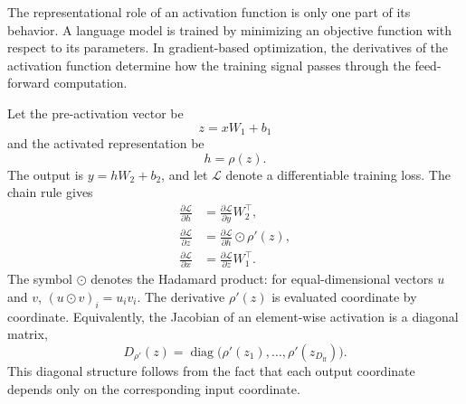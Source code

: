 The representational role of an activation function is only one part of its
behavior. A language model is trained by minimizing an objective function
with respect to its parameters. In gradient-based optimization, the
derivatives of the activation function determine how the training signal
passes through the feed-forward computation.

Let the pre-activation vector be
\begin{equation}
    z=xW_1+b_1
    \label{eq:act-preactivation}
\end{equation}
and the activated representation be
\begin{equation}
    h=\rho(z).
    \label{eq:act-hidden}
\end{equation}
The output is \(y=hW_2+b_2\), and let
\(\mathcal{L}\) denote a differentiable training loss. The chain rule gives
\begin{align}
    \frac{\partial\mathcal{L}}{\partial h}
    &=
    \frac{\partial\mathcal{L}}{\partial y}W_2^{\top},
    \label{eq:act-gradient-hidden}\\
    \frac{\partial\mathcal{L}}{\partial z}
    &=
    \frac{\partial\mathcal{L}}{\partial h}
    \odot \rho'(z),
    \label{eq:act-gradient-preactivation}\\
    \frac{\partial\mathcal{L}}{\partial x}
    &=
    \frac{\partial\mathcal{L}}{\partial z}W_1^{\top}.
    \label{eq:act-gradient-input}
\end{align}
The symbol \(\odot\) denotes the Hadamard product: for equal-dimensional
vectors \(u\) and \(v\), \((u\odot v)_i=u_iv_i\). The derivative
\(\rho'(z)\) is evaluated coordinate by coordinate. Equivalently, the
Jacobian of an element-wise activation is a diagonal matrix,
\begin{equation}
    D_{\rho'}(z)
    =
    \operatorname{diag}
    \bigl(\rho'(z_1),\ldots,\rho'(z_{D_{\mathrm{ff}}})\bigr).
    \label{eq:act-diagonal-jacobian}
\end{equation}
This diagonal structure follows from the fact that each output coordinate
depends only on the corresponding input coordinate.

